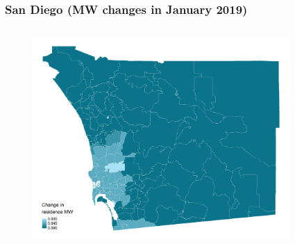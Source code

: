 \documentclass[aspectratio=169, t]{beamer}
\begin{document}
\begin{frame}[label = bay_example]
\begin{columns}
\begin{column}{0.50\textwidth}
\begin{figure}
            \end{figure}   
        \end{column}
    \end{columns}
    \hyperlink{chi_example}{}
\end{frame}


\begin{frame}[label = san_diego_example]
\frametitle{San Diego (MW changes in January 2019)}
    \begin{columns}
        \begin{column}{0.50\textwidth}
            \vspace{-4mm}
            \begin{figure}
                \centering
                \includegraphics[scale = 0.3]{maps_events/output/san_diego_2018-12_statutory_mw.png}
            \end{figure}   
        \end{column}
        \begin{column}{0.50\textwidth}
            \vspace{-4mm}
            \begin{figure}
                \centering

\end{figure}
\end{column}
\end{columns}
\end{frame}
\end{document}
